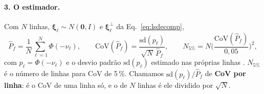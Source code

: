 \documentclass[11pt,a4paper]{article}
\newcommand{\xib}{\bm\xi}
\begin{document}
\paragraph{3. O estimador.} Com $N$ linhas, $\xib_\ell \sim N(\bm 0, I)$ e $\xib^\perp_\ell$ da
Eq.~\eqref{eq:lsdecomp},
\begin{equation}
  \hat P_f = \frac{1}{N}\sum_{\ell=1}^{N}\Phi(-\nu_\ell), \qquad
  \mathrm{CoV}(\hat P_f) = \frac{\mathrm{sd}(p_\ell)}{\sqrt N\,\hat P_f}, \qquad
  N_{5\%} = N\Big(\frac{\mathrm{CoV}(\hat P_f)}{0{,}05}\Big)^2,
  \label{eq:lsest}
\end{equation}
com $p_\ell = \Phi(-\nu_\ell)$ e o desvio padrão $\mathrm{sd}(p_\ell)$ estimado nas próprias linhas
\citep{koutsourelakis2004}. $N_{5\%}$ é o número de linhas para CoV de 5\,\%. Chamamos
$\mathrm{sd}(p_\ell)/\hat P_f$ de \textbf{CoV por linha}: é o CoV de uma linha só, e o de $N$ linhas é ele dividido por
$\sqrt N$.
\end{document}
